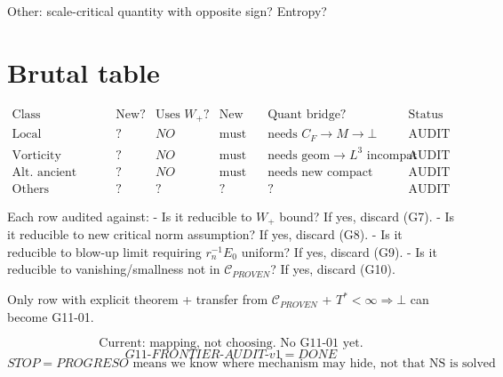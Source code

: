 \documentclass[11pt]{article}
\begin{document}
Other: scale-critical quantity with opposite sign? Entropy?

\section{Brutal table}
\[
\begin{array}{c|c|c|c|c|c}
\text{Class}&\text{New?}&\text{Uses }W_+?& \text{New hyp?}&\text{Quant bridge?}&\text{Status}\\ \hline
\text{Local energy/monot.}&?&NO&\text{must not}&\text{needs }C_F\to M\to\bot&\text{AUDIT}\\
\text{Vorticity topology}&?&NO&\text{must not}&\text{needs geom}\to L^3\text{ incompat}&\text{AUDIT}\\
\text{Alt. ancient rigidity}&?&NO&\text{must not}&\text{needs new compact proc.}&\text{AUDIT}\\
\text{Others}&?&?&?&?&\text{AUDIT}
\end{array}
\]

Each row audited against:
- Is it reducible to $W_+$ bound? If yes, discard (G7).
- Is it reducible to new critical norm assumption? If yes, discard (G8).
- Is it reducible to blow-up limit requiring $r_n^{-1}E_0$ uniform? If yes, discard (G9).
- Is it reducible to vanishing/smallness not in $\mathcal C_{PROVEN}$? If yes, discard (G10).

Only row with explicit theorem + transfer from $\mathcal C_{PROVEN}$ + $T^*<\infty\Rightarrow\bot$ can become G11-01.

\[
\boxed{\text{Current: mapping, not choosing. No G11-01 yet.}}
\]
\[
\boxed{G11\text{-}FRONTIER\text{-}AUDIT\text{-}v1 = DONE}
\]
\[
\boxed{STOP=PROGRESO \text{ means we know where mechanism may hide, not that NS is solved}}
\]
\end{document}
